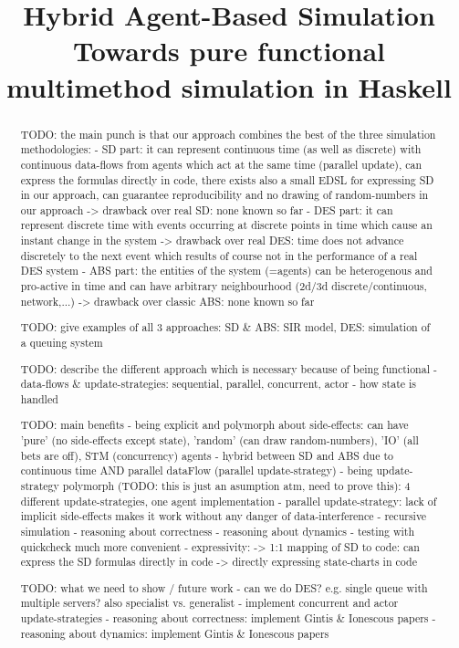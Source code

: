 \documentclass[10pt, onecolumn, conference]{../../../templates/IEEEtran/IEEEtran}
\title{Hybrid Agent-Based Simulation \\ {\large Towards pure functional multimethod simulation in Haskell}}
\author{
	\IEEEauthorblockN{Jonathan Thaler}
	\IEEEauthorblockA{School of Computer Science\\
		University of Nottingham\\
		jonathan.thaler@nottingham.ac.uk}
		
	\and
		
	\IEEEauthorblockN{Peer-Olaf Siebers}
	\IEEEauthorblockA{School of Computer Science\\
		University of Nottingham\\
		peer-olaf.siebers@nottingham.ac.uk}
}
\begin{document}
\maketitle 

\begin{abstract}
TODO: the main punch is that our approach combines the best of the three simulation methodologies:
	- SD part: 	it can represent continuous time (as well as discrete) with continuous data-flows from agents which act at the same time (parallel update), can express the formulas directly in code, there exists also a small EDSL for expressing SD in our approach, can guarantee reproducibility and no drawing of random-numbers in our approach
		-> drawback over real SD: none known so far 
	- DES part: it can represent discrete time with events occurring at discrete points in time which cause an instant change in the system
		-> drawback over real DES: time does not advance discretely to the next event which results of course not in the performance of a real DES system
	- ABS part:	the entities of the system (=agents) can be heterogenous and pro-active in time and can have arbitrary neighbourhood (2d/3d discrete/continuous, network,...)
		-> drawback over classic ABS: none known so far 

TODO: give examples of all 3 approaches: SD \& ABS: SIR model, DES: simulation of a queuing system

TODO: describe the different approach which is necessary because of being functional 
	- data-flows \& update-strategies: sequential, parallel, concurrent, actor
	- how state is handled

TODO: main benefits
	- being explicit and polymorph about side-effects: can have 'pure' (no side-effects except state), 'random' (can draw random-numbers), 'IO' (all bets are off), STM (concurrency) agents
	- hybrid between SD and ABS due to continuous time AND parallel dataFlow (parallel update-strategy)
	- being update-strategy polymorph (TODO: this is just an asumption atm, need to prove this): 4 different update-strategies, one agent implementation
	- parallel update-strategy: lack of implicit side-effects makes it work without any danger of data-interference
	- recursive simulation
	- reasoning about correctness
	- reasoning about dynamics 
	- testing with quickcheck much more convenient
	- expressivity:
		-> 1:1 mapping of SD to code: can express the SD formulas directly in code
		-> directly expressing state-charts in code
	
TODO: what we need to show / future work
	- can we do DES? e.g. single queue with multiple servers? also specialist vs. generalist
	- implement concurrent and actor update-strategies
	- reasoning about correctness: implement Gintis \& Ionescous papers 
	- reasoning about dynamics: implement Gintis \& Ionescous papers
	

\end{abstract}
\end{document}
